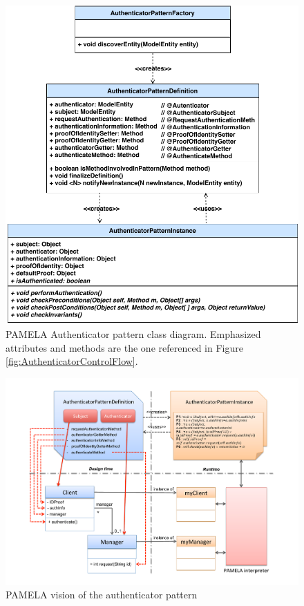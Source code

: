 \begin{figure}
    \centering
    \includegraphics[width=0.8 \columnwidth]{figures/PAMELAAuthenticator_CD.pdf}
    \caption{PAMELA Authenticator pattern class diagram. Emphasized attributes and methods are the one referenced in Figure \ref{fig:AuthenticatorControlFlow}.}
    \label{fig:PAMELAAuthenticator_CD}
\end{figure}

\begin{figure}
    \centering
    \includegraphics[width=1.0 \columnwidth]{figures/AuthenticatorPattern4.pdf}
    \caption{PAMELA vision of the authenticator pattern}
    \label{fig:AuthenticatorPattern}
\end{figure}

